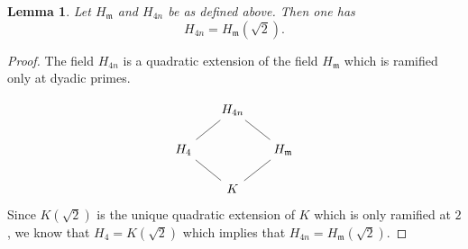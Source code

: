 \documentclass[11pt, reqno]{amsart}
\theoremstyle{plain}
\newtheorem{lemma}[theorem]{Lemma}
\theoremstyle{definition}
\numberwithin{equation}{section}
\begin{document}
\begin{lemma}\label{HH2}
Let $H_{\mathfrak{m}}$ and $H_{4n}$ be as defined  above. Then one has
$$
H_{4n}=H_{\mathfrak{m}}(\sqrt{2}).
$$





    






 
     
\end{lemma}
  
\begin{proof}
The field $H_{4n}$ is a quadratic extension of the field $H_{\mathfrak{m}}$ which is ramified only at dyadic primes. 

\[
\begin{tikzcd}[row sep=1em, column sep=1.5em, every arrow/.append style = {-}]
 & H_{4n} \arrow[dl] \arrow[dr] & \\[6pt]
H_{4} \arrow[dr] & & H_{\mathfrak{m}} \arrow[dl] \\[6pt]
 & K &
\end{tikzcd}
\]
Since $K(\sqrt{2})$ is the unique quadratic extension of $K$ which is only ramified at $2$, we know that  $H_{4}=K(\sqrt{2})$ which implies that  $H_{4n}=H_{\mathfrak{m}}(\sqrt{2})$. 

\end{proof}
\end{document}
